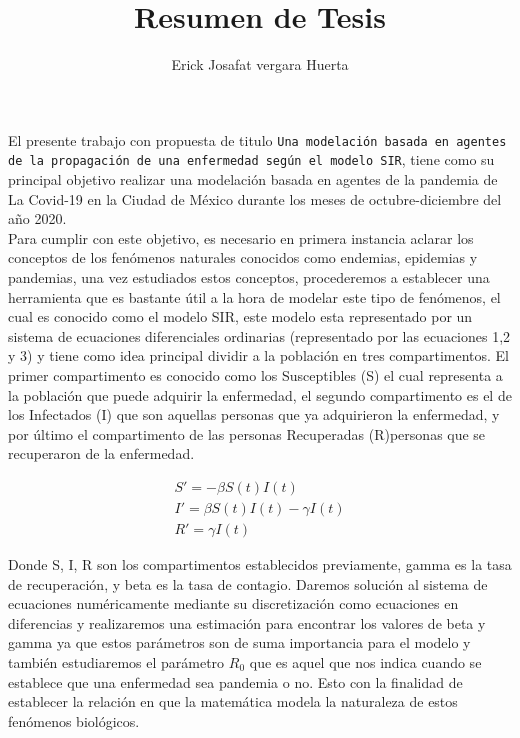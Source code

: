 \documentclass[a4paper,openany,12pt]{article}
\title{Resumen de Tesis}
\date{}
\author{Erick Josafat vergara Huerta}
\begin{document}
\maketitle

El presente trabajo con propuesta de titulo \guillemotleft  \texttt{Una modelación basada en agentes de la propagación de una enfermedad según el modelo SIR}\guillemotright, tiene como su principal objetivo realizar una modelación basada en agentes de la pandemia de La Covid-19 en la Ciudad de México durante los meses de octubre-diciembre del año 2020.\\

Para cumplir con este objetivo, es necesario en primera instancia aclarar los conceptos de los fenómenos naturales conocidos como endemias, epidemias y pandemias, una vez estudiados estos conceptos, procederemos a establecer una herramienta que es bastante útil a la hora de modelar este tipo de fenómenos, el cual es conocido como el modelo SIR, este modelo esta representado por un sistema de ecuaciones diferenciales ordinarias (representado por las ecuaciones 1,2 y 3) y tiene como idea principal dividir a la población en tres compartimentos. El primer compartimento es conocido como los Susceptibles (S) el cual representa a la población que puede adquirir la enfermedad, el segundo compartimento es el de los Infectados (I) que son aquellas personas que ya adquirieron la enfermedad, y por último el compartimento de las personas Recuperadas (R)personas que se recuperaron de la enfermedad.

\begin{align}
S' = -\beta S\left(t\right)I\left(t\right)\\ 			
I' = \beta S\left(t\right)I\left(t\right) - \gamma I\left(t\right)
\\ 
R' = \gamma I\left(t\right)
\end{align} 

Donde S, I, R son los compartimentos establecidos previamente, gamma es la tasa de recuperación, y beta es la tasa de contagio. Daremos solución al sistema de ecuaciones numéricamente mediante su discretización como ecuaciones en diferencias y realizaremos una estimación para encontrar los valores de beta y gamma ya que estos parámetros son de suma importancia para el modelo y también estudiaremos el parámetro $R_{0}$ que es aquel que nos indica cuando se establece que una enfermedad sea pandemia o no.
Esto con la finalidad de establecer la relación en que la matemática modela la naturaleza de estos fenómenos biológicos.\\
\end{document}
